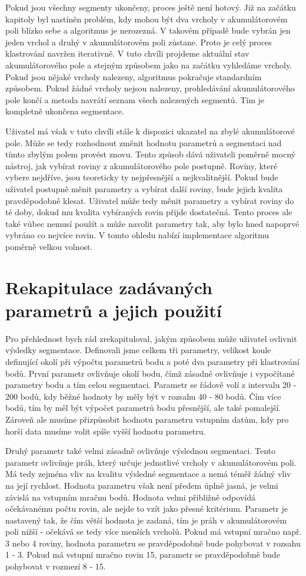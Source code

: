 \documentclass[11pt,twoside,a4paper]{book}
\begin{document}
Pokud jsou všechny segmenty ukončeny, proces ještě není hotový. Již na začátku kapitoly byl nastíněn problém, kdy mohou být dva vrcholy v akumulátorovém poli blízko sebe a algoritmus je nerozezná. V takovém případě bude vybrán jen jeden vrchol a druhý v akumulátorovém poli zůstane. Proto je celý proces klastrování navržen iterativně. V tuto chvíli projdeme aktuální stav akumulátorového pole a stejným způsobem jako na začátku vyhledáme vrcholy. Pokud jsou nějaké vrcholy nalezeny, algoritmus pokračuje standardním způsobem. Pokud žádné vrcholy nejsou nalezeny, prohledávání akumulátorového pole končí a metoda navrátí seznam všech nalezených segmentů. Tím je kompletně ukončena segmentace. 

Uživatel má však v tuto chvíli stále k dispozici ukazatel na zbylé akumulátorové pole. Může se tedy rozhodnout změnit hodnotu parametrů a segmentaci nad tímto zbylým polem provést znovu. Tento způsob dává uživateli poměrně mocný nástroj, jak vybírat roviny z akumulátorového pole postupně. Roviny, které vybere nejdříve, jsou teoreticky ty nejpřesnější a nejkvalitnější. Pokud bude uživatel postupně měnit parametry a vybírat další roviny, bude jejich kvalita pravděpodobně klesat. Uživatel může tedy měnit parametry a vybírat roviny do té doby, dokud mu kvalita vybíraných rovin přijde dostatečná. Tento proces ale také vůbec nemusí použít a může navolit parametry tak, aby bylo hned napoprvé vybráno co nejvíce rovin. V tomto ohledu nabízí implementace algoritmu poměrně velkou volnost.


\section{Rekapitulace zadávaných parametrů a jejich použití}
\label{sub:param}

Pro přehlednost bych rád zrekapituloval, jakým způsobem může uživatel ovlivnit výsledky segmentace. Definovali jsme celkem tři parametry, velikost koule definující okolí při výpočtu parametrů bodu a poté dva parametry při klastrování bodů. První parametr ovlivňuje okolí bodu, čímž zásadně ovlivňuje i vypočítané parametry bodu a tím celou segmentaci. Parametr se řádově volí z intervalu 20 - 200 bodů, kdy běžné hodnoty by měly být v rozsahu 40 - 80 bodů. Čím více bodů, tím by měl být výpočet parametrů bodu přesnější, ale také pomalejší. Zároveň ale musíme přizpůsobit hodnotu parametru vstupním datům, kdy pro horší data musíme volit spíše vyšší hodnotu parametru. 

Druhý parametr také velmi zásadně ovlivňuje výslednou segmentaci. Tento parametr ovlivňuje práh, který určuje jednotlivé vrcholy v akumulátorovém poli. Má tedy zejména vliv na kvalitu výsledné segmentace a nemá téměř žádný vliv na její rychlost. Hodnota parametru však není předem úplně jasná, je velmi závislá na vstupním mračnu bodů. Hodnota velmi přibližně odpovídá očekávanému počtu rovin, ale nejde to vzít jako přesné kritérium. Parametr je nastavený tak, že čím větší hodnota je zadaná, tím je práh v akumulátorovém poli nižší - očekává se tedy více menších vrcholů. Pokud má vstupní mračno např. 3 nebo 4 roviny, hodnota parametru se pravděpodobně bude pohybovat v rozsahu 1 - 3. Pokud má vstupní mračno rovin 15, parametr se pravděpodobně bude pohybovat v rozmezí 8 - 15.
\end{document}
